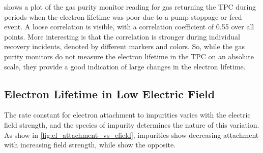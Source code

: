 \documentclass[herrin-thesis.tex]{subfiles}
\begin{document}
 shows a plot of the gas purity monitor reading for gas returning the TPC during periods when the electron lifetime was poor due to a pump stoppage or feed event. A loose correlation is visible, with a correlation coefficient of 0.55 over all points. More interesting is that the correlation is stronger during individual recovery incidents, denoted by different markers and colors. So, while the gas purity monitors do not measure the electron lifetime in the TPC on an absolute scale, they provide a good indication of large changes in the electron lifetime.

\subsection{Electron Lifetime in Low Electric Field}
The rate constant for electron attachment to impurities varies with the electric field strength, and the species of impurity determines the nature of this variation. As show in \cref{fig:el_attachment_vs_efield}\cite{Bakale:1976ly},  impurities show decreasing attachment with increasing field strength, while  show the opposite.
\end{document}
